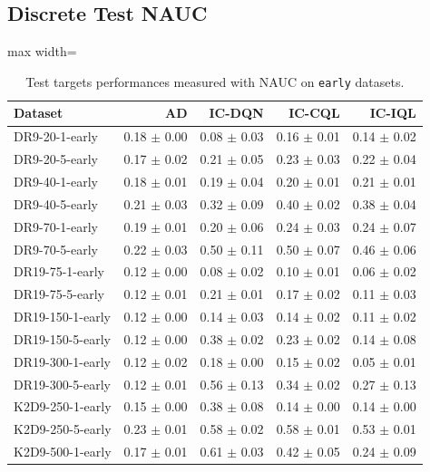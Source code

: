 \documentclass{article}
\begin{document}
\subsection{Discrete Test NAUC}
\begin{table}[ht]
    \label{tab:}
    \begin{center}
    \caption{Test targets performances measured with NAUC on \texttt{early} datasets.}
    \begin{small}
    \begin{adjustbox}{max width=\columnwidth}
		\begin{tabular}{l|rrrr}
		\toprule
	\textbf{Dataset} & \textbf{AD} & \textbf{IC-DQN} & \textbf{IC-CQL} & \textbf{IC-IQL}\\
\midrule
DR9-20-1-early & 0.18 $\pm$ 0.00 & 0.08 $\pm$ 0.03 & 0.16 $\pm$ 0.01 & 0.14 $\pm$ 0.02\\
DR9-20-5-early & 0.17 $\pm$ 0.02 & 0.21 $\pm$ 0.05 & 0.23 $\pm$ 0.03 & 0.22 $\pm$ 0.04\\
DR9-40-1-early & 0.18 $\pm$ 0.01 & 0.19 $\pm$ 0.04 & 0.20 $\pm$ 0.01 & 0.21 $\pm$ 0.01\\
DR9-40-5-early & 0.21 $\pm$ 0.03 & 0.32 $\pm$ 0.09 & 0.40 $\pm$ 0.02 & 0.38 $\pm$ 0.04\\
DR9-70-1-early & 0.19 $\pm$ 0.01 & 0.20 $\pm$ 0.06 & 0.24 $\pm$ 0.03 & 0.24 $\pm$ 0.07\\
DR9-70-5-early & 0.22 $\pm$ 0.03 & 0.50 $\pm$ 0.11 & 0.50 $\pm$ 0.07 & 0.46 $\pm$ 0.06\\
DR19-75-1-early & 0.12 $\pm$ 0.00 & 0.08 $\pm$ 0.02 & 0.10 $\pm$ 0.01 & 0.06 $\pm$ 0.02\\
DR19-75-5-early & 0.12 $\pm$ 0.01 & 0.21 $\pm$ 0.01 & 0.17 $\pm$ 0.02 & 0.11 $\pm$ 0.03\\
DR19-150-1-early & 0.12 $\pm$ 0.00 & 0.14 $\pm$ 0.03 & 0.14 $\pm$ 0.02 & 0.11 $\pm$ 0.02\\
DR19-150-5-early & 0.12 $\pm$ 0.00 & 0.38 $\pm$ 0.02 & 0.23 $\pm$ 0.02 & 0.14 $\pm$ 0.08\\
DR19-300-1-early & 0.12 $\pm$ 0.02 & 0.18 $\pm$ 0.00 & 0.15 $\pm$ 0.02 & 0.05 $\pm$ 0.01\\
DR19-300-5-early & 0.12 $\pm$ 0.01 & 0.56 $\pm$ 0.13 & 0.34 $\pm$ 0.02 & 0.27 $\pm$ 0.13\\
K2D9-250-1-early & 0.15 $\pm$ 0.00 & 0.38 $\pm$ 0.08 & 0.14 $\pm$ 0.00 & 0.14 $\pm$ 0.00\\
K2D9-250-5-early & 0.23 $\pm$ 0.01 & 0.58 $\pm$ 0.02 & 0.58 $\pm$ 0.01 & 0.53 $\pm$ 0.01\\
K2D9-500-1-early & 0.17 $\pm$ 0.01 & 0.61 $\pm$ 0.03 & 0.42 $\pm$ 0.05 & 0.24 $\pm$ 0.09\\

\end{tabular}
\end{adjustbox}
\end{small}
\end{center}
\end{table}
\end{document}
